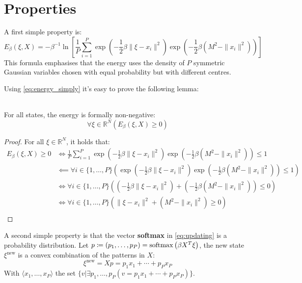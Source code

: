\section{Properties}
A first simple property is:
\begin{equation}
\label{eq:energy_simply}
E_\beta\left(\xi,X\right) = -\beta^{-1}\ln\left[\frac{1}{P}\sum_{i=1}^{P}\exp\left(-\frac12\beta\|\xi-x_i\|^2\right)\exp\left(-\frac12\beta\left(M^2-\|x_i\|^2\right)\right)\right]
\end{equation}
This formula emphasises that the energy uses the density of $P$ symmetric Gaussian variables chosen with equal probability but with different centres.

\noindent Using \cref{eq:energy_simply} it's easy to prove the following lemma:
\begin{lemma}\\
    For all states, the energy is formally non-negative:
    \[
        \forall\xi\in\mathbb{R}^N\left(E_\beta\left(\xi,X\right)\geq0\right)
    \]
    \begin{proof}
        For all $\xi\in\mathbb{R}^N$, it holds that:
        \begin{align*}
            E_\beta\left(\xi,X\right)\geq0 &\iff \frac{1}{P}\sum_{i=1}^{P}\exp\left(-\frac12\beta\|\xi-x_i\|^2\right)\exp\left(-\frac12\beta\left(M^2-\|x_i\|^2\right)\right) \leq 1 \\
            &\impliedby \forall{i\in\{1,\ldots,P\}} \left(\exp\left(-\frac12\beta\|\xi-x_i\|^2\right)\exp\left(-\frac12\beta\left(M^2-\|x_i\|^2\right)\right)\leq1\right) \\
            &\iff \forall{i\in\{1,\ldots,P\}} \left(\left(-\frac12\beta\|\xi-x_i\|^2\right)+\left(-\frac12\beta\left(M^2-\|x_i\|^2\right)\right)\leq0\right) \\
            &\iff \forall{i\in\{1,\ldots,P\}} \left(\|\xi-x_i\|^2+\left(M^2-\|x_i\|^2\right)\geq0\right) \\
        \end{align*}
    \end{proof}
\end{lemma}
A second simple property is that the vector \textbf{softmax} in \cref{eq:updating} is a probability distribution. Let $p \coloneqq \left(p_1,\ldots,p_P\right)=\operatorname{softmax}\left(\beta X^T\xi\right)$, the new state $\xi^{\text{new}}$ is a convex combination of the patterns in $X$:
\[
\xi^{\text{new}} = Xp = p_1x_1+\cdots+p_Px_P
\]
With $\langle{x_1,\ldots,x_P}\rangle$ the set $\{v|\exists p_1,\ldots,p_P\left(v=p_1x_1+\cdots+p_Px_P\right)\}$.

